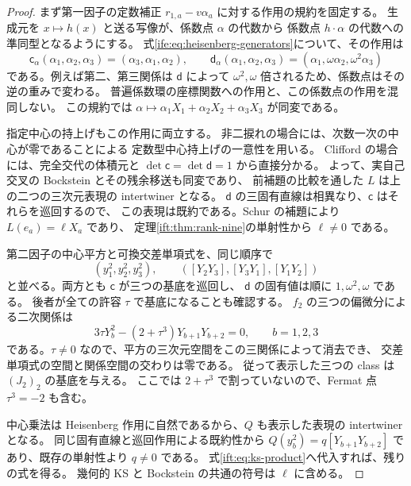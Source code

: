 \begin{proof}
まず第一因子の定数補正 $r_{1,a}-v\alpha_a$ に対する作用の規約を固定する。
生成元を $x\mapsto h(x)$ と送る写像が、係数点 $\alpha$ の代数から
係数点 $h\cdot\alpha$ の代数への準同型となるようにする。
式\eqref{ife:eq:heisenberg-generators}について、その作用は
\begin{equation}\label{ife:eq:constant-parameter-action}
 \mathsf c_\alpha(\alpha_1,\alpha_2,\alpha_3)
       =(\alpha_3,\alpha_1,\alpha_2),\qquad
 \mathsf d_\alpha(\alpha_1,\alpha_2,\alpha_3)
       =(\alpha_1,\omega\alpha_2,\omega^2\alpha_3)
\end{equation}
である。例えば第二、第三関係は $\mathsf d$ によって
$\omega^2,\omega$ 倍されるため、係数点はその逆の重みで変わる。
普遍係数環の座標関数への作用と、この係数点の作用を混同しない。
この規約では
$\alpha\mapsto\alpha_1X_1+\alpha_2X_2+\alpha_3X_3$ が同変である。

指定中心の持上げもこの作用に両立する。
非二捩れの場合には、次数一次の中心が零であることによる
定数型中心持上げの一意性を用いる。
Clifford の場合には、完全交代の体積元と
$\det\mathsf c=\det\mathsf d=1$ から直接分かる。
よって、実自己交叉の Bockstein とその残余移送も同変であり、
前補題の比較を通した $L$ は上の二つの三次元表現の intertwiner となる。
$\mathsf d$ の三固有直線は相異なり、$\mathsf c$ はそれらを巡回するので、
この表現は既約である。Schur の補題により $L(e_a)=\ell X_a$ であり、
定理\ref{ift:thm:rank-nine}の単射性から $\ell\ne0$ である。

第二因子の中心平方と可換交差単項式を、同じ順序で
\[
 (y_1^2,y_2^2,y_3^2),\qquad
 ([Y_2Y_3],[Y_3Y_1],[Y_1Y_2])
\]
と並べる。両方とも $\mathsf c$ が三つの基底を巡回し、
$\mathsf d$ の固有値は順に $1,\omega^2,\omega$ である。
後者が全ての許容 $\tau$ で基底になることも確認する。
$f_2$ の三つの偏微分による二次関係は
\begin{equation}\label{ife:eq:cross-basis}
       3\tau Y_b^2-(2+\tau^3)Y_{b+1}Y_{b+2}=0,
                          \qquad b=1,2,3
\end{equation}
である。$\tau\ne0$ なので、平方の三次元空間をこの三関係によって消去でき、
交差単項式の空間と関係空間の交わりは零である。
従って表示した三つの class は $(J_2)_2$ の基底を与える。
ここでは $2+\tau^3$ で割っていないので、Fermat 点 $\tau^3=-2$ も含む。

中心乗法は Heisenberg 作用に自然であるから、$Q$ も表示した表現の intertwiner となる。
同じ固有直線と巡回作用による既約性から
$Q(y_b^2)=q[Y_{b+1}Y_{b+2}]$ であり、既存の単射性より $q\ne0$ である。
式\eqref{ift:eq:ks-product}へ代入すれば、残りの式を得る。
幾何的 KS と Bockstein の共通の符号は $\ell$ に含める。
\end{proof}

